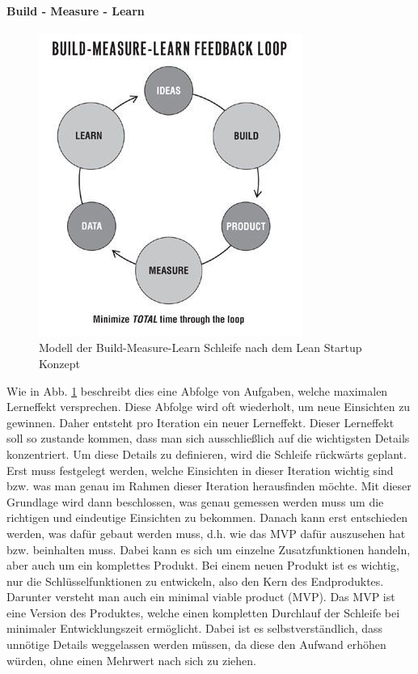 \paragraph{Build - Measure - Learn}
\begin{figure}
	\begin{center}
		\includegraphics[scale=1]{99_IMG/02_Grundlagen/buildmeasurelearn.jpg}
		\caption{Modell der Build-Measure-Learn Schleife nach dem Lean Startup Konzept}
		\label{LeanStartup_BuildMeasureLearn}
	\end{center}
\end{figure}
Wie in Abb. \ref{LeanStartup_BuildMeasureLearn} beschreibt dies eine Abfolge von Aufgaben, welche maximalen Lerneffekt versprechen. Diese Abfolge wird oft wiederholt, um neue Einsichten zu gewinnen. Daher entsteht pro Iteration ein neuer Lerneffekt. Dieser Lerneffekt soll so zustande kommen, dass man sich ausschließlich auf die wichtigsten Details konzentriert. Um diese Details zu definieren, wird die Schleife rückwärts geplant. Erst muss festgelegt werden, welche Einsichten in dieser Iteration wichtig sind bzw. was man genau im Rahmen dieser Iteration herausfinden möchte. Mit dieser Grundlage wird dann beschlossen, was genau gemessen werden muss um die richtigen und eindeutige Einsichten zu bekommen. Danach kann erst entschieden werden, was dafür gebaut werden muss, d.h. wie das MVP dafür auszusehen hat bzw. beinhalten muss. Dabei kann es sich um einzelne Zusatzfunktionen handeln, aber auch um ein komplettes Produkt. Bei einem neuen Produkt ist es wichtig, nur die Schlüsselfunktionen zu entwickeln, also den Kern des Endproduktes. Darunter versteht man auch ein minimal viable product (MVP). Das MVP ist eine Version des Produktes, welche einen kompletten Durchlauf der Schleife bei minimaler Entwicklungszeit ermöglicht. Dabei ist es selbstverständlich, dass unnötige Details weggelassen werden müssen, da diese den Aufwand erhöhen würden, ohne einen Mehrwert nach sich zu ziehen.

